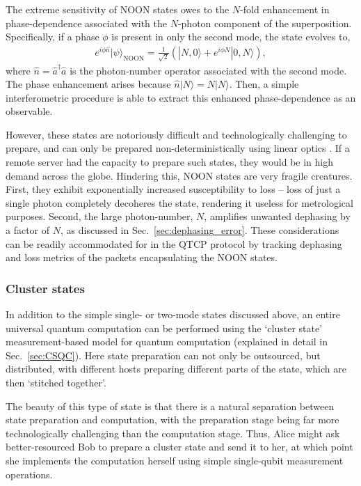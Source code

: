 \documentclass[aps, rmp, twocolumn, amsmath, amssymb, nofootinbib, superscriptaddress, longbibliography, floatfix, table-of-contents, eqsecnum]{revtex4-1}
\newcommand{\ket}[1]{|#1\rangle}
\newcommand{\comment}[1]{{\color{blue}{\textbf{#1}}}}
\begin{document}
The extreme sensitivity of NOON states owes to the $N$-fold enhancement in phase-dependence associated with the $N$-photon component of the superposition. Specifically, if a phase $\phi$ is present in only the second mode, the state evolves to,
\begin{align}
e^{i\phi\hat{n}} \ket\psi_\text{NOON} = \frac{1}{\sqrt{2}}(\ket{N,0}+e^{i\phi N}\ket{0,N}),
\end{align}
where \mbox{$\hat{n}=\hat{a}^\dag\hat{a}$} is the photon-number operator associated with the second mode. The phase enhancement arises because \mbox{$\hat{n}\ket{N}=N\ket{N}$}. Then, a simple interferometric procedure is able to extract this enhanced phase-dependence as an observable.

However, these states are notoriously difficult and technologically challenging to prepare, and can only be prepared non-deterministically using linear optics \cite{bib:Cable07}. If a remote server had the capacity to prepare such states, they would be in high demand across the globe. Hindering this, NOON states are very fragile creatures. First, they exhibit exponentially increased susceptibility to loss -- loss of just a single photon completely decoheres the state, rendering it useless for metrological purposes. Second, the large photon-number, $N$, amplifies unwanted dephasing by a factor of $N$, as discussed in Sec.~\ref{sec:dephasing_error}. These considerations can be readily accommodated for in the QTCP protocol by tracking dephasing and loss metrics of the packets encapsulating the NOON states.

\comment{Talk more about how to make them}

%
%

\subsubsection{Cluster states} 

In addition to the simple single- or two-mode states discussed above, an entire universal quantum computation can be performed using the `cluster state' measurement-based model for quantum computation (explained in detail in Sec.~\ref{sec:CSQC}). Here state preparation can not only be outsourced, but distributed, with different hosts preparing different parts of the state, which are then `stitched together'.

The beauty of this type of state is that there is a natural separation between state preparation and computation, with the preparation stage being far more technologically challenging than the computation stage. Thus, Alice might ask better-resourced Bob to prepare a cluster state and send it to her, at which point she implements the computation herself using simple single-qubit measurement operations.
\end{document}
